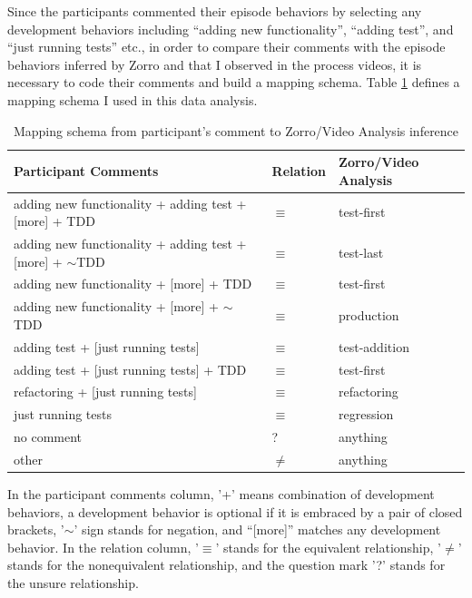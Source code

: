 Since the participants commented their episode behaviors by selecting
any development behaviors including ``adding new functionality'',
``adding test'', and ``just running tests'' etc., in order to compare
their comments with the episode behaviors inferred by Zorro and
that I observed in the process videos, it is necessary to code their 
comments and build a mapping schema. Table \ref{tab:ParticipantCommentMapping}
defines a mapping schema I used in this data analysis. 
\begin{table}[!ht] 
  \centering
\begin{tabular}{|l|l|l|} \hline
  Participant Comments &  Relation & Zorro/Video Analysis \\ \hline
  adding new functionality + adding test + [more] + TDD & \(\equiv\) & test-first \\ \hline
  adding new functionality + adding test + [more] + \(\sim\)TDD & \(\equiv\) & test-last \\ \hline
  adding new functionality + [more] + TDD  & \(\equiv\) & test-first \\ \hline
  adding new functionality + [more] + \(\sim\)TDD & \(\equiv\) & production \\ \hline
  adding test + [just running tests] & \(\equiv\)  & test-addition \\ \hline
  adding test + [just running tests] + TDD & \(\equiv\) & test-first \\ \hline
  refactoring + [just running tests] & \(\equiv\) & refactoring \\ \hline
  just running tests & \(\equiv\) &  regression \\ \hline
  no comment & ? & anything \\ \hline
  other      & \(\neq\) & anything \\ \hline
  \end{tabular}  
  \caption{Mapping schema from participant's comment to Zorro/Video Analysis inference}
  \label{tab:ParticipantCommentMapping} 
\end{table}
In the participant comments column, '+' means combination of
development behaviors, a development behavior is optional if it is
embraced by a pair of closed brackets, '\(\sim\)' sign stands for
negation, and ``[more]'' matches any development behavior. In the
relation column, '\(\equiv\)' stands for the equivalent relationship,
'\(\neq\)' stands for the nonequivalent relationship, and the question mark
'?' stands for the unsure relationship.
 
